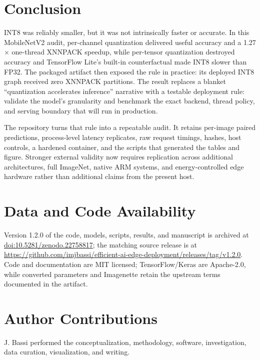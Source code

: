 \section{Conclusion}
\label{sec:conclusion}

INT8 was reliably smaller, but it was not intrinsically faster or accurate. In this MobileNetV2 audit, per-channel quantization delivered useful accuracy and a 1.27$\times$ one-thread XNNPACK speedup, while per-tensor quantization destroyed accuracy and TensorFlow Lite's built-in counterfactual made INT8 slower than FP32. The packaged artifact then exposed the rule in practice: its deployed INT8 graph received zero XNNPACK partitions. The result replaces a blanket ``quantization accelerates inference'' narrative with a testable deployment rule: validate the model's granularity and benchmark the exact backend, thread policy, and serving boundary that will run in production.

The repository turns that rule into a repeatable audit. It retains per-image paired predictions, process-level latency replicates, raw request timings, hashes, host controls, a hardened container, and the scripts that generated the tables and figure. Stronger external validity now requires replication across additional architectures, full ImageNet, native ARM systems, and energy-controlled edge hardware rather than additional claims from the present host.

\section*{Data and Code Availability}

Version 1.2.0 of the code, models, scripts, results, and manuscript is archived at \href{https://doi.org/10.5281/zenodo.22758817}{doi:10.5281/zenodo.22758817}; the matching source release is at \url{https://github.com/imjbassi/efficient-ai-edge-deployment/releases/tag/v1.2.0}. Code and documentation are MIT licensed; TensorFlow/Keras are Apache-2.0, while converted parameters and Imagenette retain the upstream terms documented in the artifact.

\section*{Author Contributions}

J. Bassi performed the conceptualization, methodology, software, investigation, data curation, visualization, and writing.

